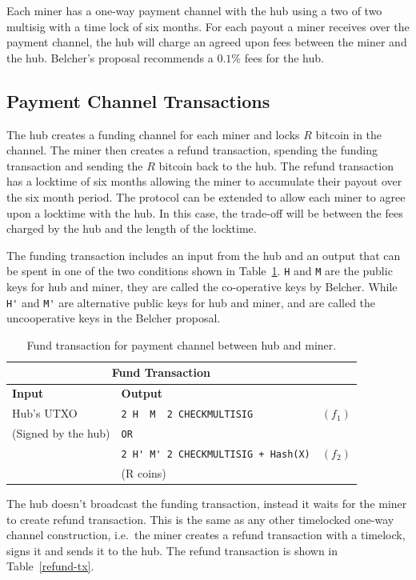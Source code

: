 \documentclass{article}
\begin{document}
Each miner has a one-way payment channel with the hub using a two of
two multisig with a time lock of six months. For each payout a miner
receives over the payment channel, the hub will charge an agreed upon
fees between the miner and the hub. Belcher's proposal recommends a
$0.1\%$ fees for the hub.

\subsection{Payment Channel Transactions}

The hub creates a funding channel for each miner and locks $R$ bitcoin
in the channel. The miner then creates a refund transaction, spending
the funding transaction and sending the $R$ bitcoin back to the
hub. The refund transaction has a locktime of six months allowing the
miner to accumulate their payout over the six month period. The
protocol can be extended to allow each miner to agree upon a locktime
with the hub. In this case, the trade-off will be between the fees
charged by the hub and the length of the locktime.

The funding transaction includes an input from the hub and an output
that can be spent in one of the two conditions shown in
Table~\ref{fund-tx}. \verb|H| and \verb|M| are the public keys for hub
and miner, they are called the co-operative keys by Belcher. While
\verb|H'| and \verb|M'| are alternative public keys for hub and miner,
and are called the uncooperative keys in the Belcher proposal.


\begin{table}
  \centering
  \begin{tabular}{ llr }
    \multicolumn{2}{c}{\bfseries Fund Transaction} \\
    \midrule
    \bfseries Input & \bfseries Output \\
    \midrule
    Hub's UTXO & \verb|2 H  M  2 CHECKMULTISIG| & $(f_1)$ \\
    (Signed by the hub) & \verb|OR| \\
                    & \verb|2 H' M' 2 CHECKMULTISIG + Hash(X)| & $(f_2)$ \\
    & (R coins) \\
    \midrule
  \end{tabular}
  \caption{Fund transaction for payment channel between hub and miner.}\label{fund-tx}
\end{table}


The hub doesn't broadcast the funding transaction, instead it waits
for the miner to create refund transaction. This is the same as any
other timelocked one-way channel construction, i.e.\ the miner creates
a refund transaction with a timelock, signs it and sends it to the
hub. The refund transaction is shown in Table~\ref{refund-tx}.
\end{document}
